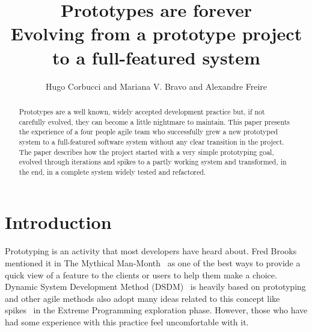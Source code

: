 \documentclass[lnbip]{svmultln}
\begin{document}
%
\mainmatter %
%
\title{Prototypes are forever\\
  Evolving from a prototype project\\ to a full-featured system}
%
%
\author{Hugo Corbucci and Mariana V. Bravo  and
  Alexandre Freire}
%
%
%

\maketitle %

\begin{abstract} %
  Prototypes are a well known, widely accepted development practice
  but, if not carefully evolved, they can become a little nightmare to
  maintain. This paper presents the experience of a four people agile
  team who successfully grew a new prototyped system to a
  full-featured software system without any clear transition in the
  project. The paper describes how the project started with a very
  simple prototyping goal, evolved through iterations and spikes to a
  partly working system and transformed, in the end, in a complete
  system widely tested and refactored.

\end{abstract}
%
\section{Introduction}

Prototyping is an activity that most developers have heard about. Fred
Brooks mentioned it in The Mythical Man-Month~\cite{Brooks1975} as one
of the best ways to provide a quick view of a feature to the clients
or users to help them make a choice. Dynamic System Development Method
(DSDM)~\cite{DSDM} is heavily based on prototyping and other agile
methods also adopt many ideas related to this concept like
spikes~\cite{XP} in the Extreme Programming exploration
phase. However, those who have had some experience with this practice
feel uncomfortable with it\cite{quem disse? esse tipo de afirmação é
  sempre bom ter uma citação, já apanhei bastante sobre isso.  ale}.
\end{document}
